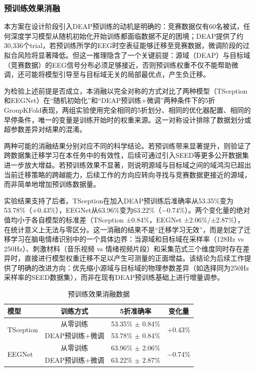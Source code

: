 \documentclass[UTF8,zihao=-4,fontset=windows]{ctexart}
\numberwithin{equation}{section}
\numberwithin{figure}{section}
\numberwithin{table}{section}
\begin{document}
\subsubsection{预训练效果消融}

本方案在设计阶段引入DEAP预训练的动机是明确的：竞赛数据仅有60名被试，任何深度学习模型从随机初始化开始训练都面临数据不足的困境；DEAP提供了约30,336个trial，若预训练所学的EEG时空表征能够迁移至竞赛数据，微调阶段的过拟合风险将显著降低。但这一推理隐含了一个关键前提：源域（DEAP）与目标域（竞赛数据）的EEG信号分布必须足够接近，否则预训练权重不仅不能帮助微调，还可能将模型引导至与目标域无关的局部最优点，产生负迁移。

为检验上述前提是否成立，本消融以完全对称的方式对比了两种模型（TSception和EEGNet）在“随机初始化”和“DEAP预训练+微调”两种条件下的5折GroupKFold表现，两组实验使用完全相同的5折划分、相同的优化器配置、相同的早停条件，唯一的变量是训练开始时的权重来源。这一对称设计排除了数据划分或超参数差异对结果的混淆。

两种可能的消融结果分别对应不同的科学结论。若预训练带来显著提升，则验证了跨数据集迁移学习在本任务中的有效性，后续可通过引入SEED等更多公开数据集进一步放大增益。若预训练效果不显著，则说明源域与目标域之间的域鸿沟已超出当前迁移策略的跨越能力，后续工作的方向应转向寻找与竞赛数据更接近的源域，而非简单地增加预训练数据量。

实验结果支持了后者。TSception在加入DEAP预训练后准确率从53.35\%变为53.78\%（+0.43\%），EEGNet从63.96\%变为63.22\%（−0.74\%）。两个变化量的绝对值均小于各自模型的标准差（TSception ±0.84\%，EEGNet ±2.06\%/\allowbreak±2.87\%），在统计意义上无法与零区分。这一消融的结果不是“迁移学习无效”，而是划定了迁移学习在脑电情绪识别中的一个具体边界：当源域和目标域在采样率（128Hz vs 250Hz）、刺激材料（音乐视频 vs 情绪视频片段）和采集范式三个维度同时存在差异时，直接进行模型权重迁移不足以产生可测量的正面增益。该结论为后续工作提供了明确的改进方向：优先缩小源域与目标域的物理参数差异（如选择同为250Hz采样率的SEED数据集），而非在现有DEAP预训练基础上进行增量调参。

\begin{table}[H]
\centering
\caption{预训练效果消融数据}
\label{tab:ablation_pretrain}
\begin{tabular}{lccc}
\toprule
\textbf{模型} & \textbf{训练方式} & \textbf{5折准确率} & \textbf{变化量} \\
\midrule
\multirow{2}{*}{TSception} & 从零训练 & 53.35\% $\pm$ 0.84\% & \multirow{2}{*}{+0.43\%} \\
                           & DEAP预训练+微调 & 53.78\% $\pm$ 0.84\% & \\
\multirow{2}{*}{EEGNet}    & 从零训练 & 63.96\% $\pm$ 2.06\% & \multirow{2}{*}{−0.74\%} \\
                           & DEAP预训练+微调 & 63.22\% $\pm$ 2.87\% & \\
\bottomrule
\end{tabular}
\end{table}
\end{document}
